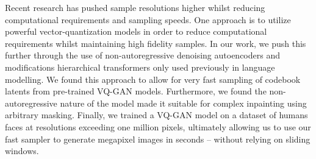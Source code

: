 
Recent research has pushed sample resolutions higher whilst reducing
computational requirements and sampling speeds. One approach is to utilize
powerful vector-quantization models in order to reduce computational
requirements whilst maintaining high fidelity samples. In our work, we push this
further through the use of non-autoregressive denoising autoencoders and
modifications hierarchical transformers only used previously in language
modelling. We found this approach to allow for very fast sampling of codebook
latents from pre-trained VQ-GAN models. Furthermore, we found the
non-autoregressive nature of the model made it suitable for complex inpainting
using arbitrary masking. Finally, we trained a VQ-GAN model on a dataset of
humans faces at resolutions exceeding one million pixels, ultimately allowing us
to use our fast sampler to generate megapixel images in seconds -- without
relying on sliding windows.



